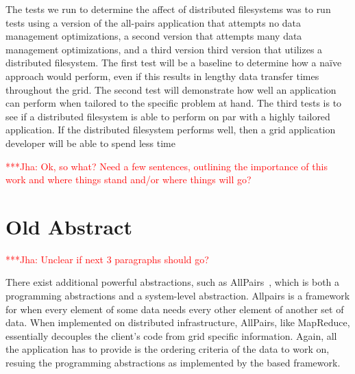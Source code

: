 \documentclass[a4paper,11pt]{article}
\newcommand{\jhanote}[1]{ {\textcolor{red} { ***Jha: #1 }}}
\newcommand{\jhanote}[1]{}
\begin{document}
The tests we run to determine the affect of distributed filesystems was to run tests using a version of the all-pairs application that attempts no data management optimizations, a second version that attempts many data management optimizations, and a third version third version that utilizes a distributed filesystem.  The first test will be a baseline to determine how a naïve approach would perform, even if this results in lengthy data transfer times throughout the grid.  The second test will demonstrate how well an application can perform when tailored to the specific problem at hand.  The third tests is to see if a distributed filesystem is able to perform on par with a highly tailored application.  If the distributed filesystem performs well, then a grid application developer will be able to spend less time 

\jhanote{Ok, so what? Need a few sentences, outlining the importance of this work and where
things stand and/or where things will go?}

\section{Old Abstract}


\jhanote{Unclear if next 3 paragraphs should go?}

There exist additional powerful abstractions, such as AllPairs~\cite{allpairs}, which is both a programming abstractions and a system-level abstraction.  Allpairs is a framework for when every element of some data needs every other element of another set of data.  When implemented on distributed infrastructure, AllPairs, like MapReduce, essentially decouples the client's code from grid specific information.  Again, all the application has to provide is the ordering criteria of the data to work on, resuing the programming abstractions as implemented by the based framework.
\end{document}
